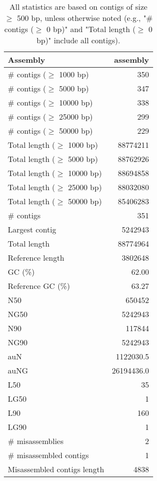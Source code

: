 \documentclass[12pt,a4paper]{article}
\begin{document}
\begin{table}[ht]
\begin{center}
\caption{All statistics are based on contigs of size $\geq$ 500 bp, unless otherwise noted (e.g., "\# contigs ($\geq$ 0 bp)" and "Total length ($\geq$ 0 bp)" include all contigs).}
\begin{tabular}{|l*{1}{|r}|}
\hline
Assembly & assembly \\ \hline
\# contigs ($\geq$ 1000 bp) & 350 \\ \hline
\# contigs ($\geq$ 5000 bp) & 347 \\ \hline
\# contigs ($\geq$ 10000 bp) & 338 \\ \hline
\# contigs ($\geq$ 25000 bp) & 299 \\ \hline
\# contigs ($\geq$ 50000 bp) & 229 \\ \hline
Total length ($\geq$ 1000 bp) & 88774211 \\ \hline
Total length ($\geq$ 5000 bp) & 88762926 \\ \hline
Total length ($\geq$ 10000 bp) & 88694858 \\ \hline
Total length ($\geq$ 25000 bp) & 88032080 \\ \hline
Total length ($\geq$ 50000 bp) & 85406283 \\ \hline
\# contigs & 351 \\ \hline
Largest contig & 5242943 \\ \hline
Total length & 88774964 \\ \hline
Reference length & 3802648 \\ \hline
GC (\%) & 62.00 \\ \hline
Reference GC (\%) & 63.27 \\ \hline
N50 & 650452 \\ \hline
NG50 & 5242943 \\ \hline
N90 & 117844 \\ \hline
NG90 & 5242943 \\ \hline
auN & 1122030.5 \\ \hline
auNG & 26194436.0 \\ \hline
L50 & 35 \\ \hline
LG50 & 1 \\ \hline
L90 & 160 \\ \hline
LG90 & 1 \\ \hline
\# misassemblies & 2 \\ \hline
\# misassembled contigs & 1 \\ \hline
Misassembled contigs length & 4838 \\ \hline

\end{tabular}
\end{center}
\end{table}
\end{document}
